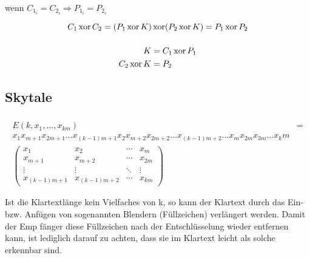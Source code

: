 \subsubsection{}

wenn $C_{1_i} = C_{2_i} \Rightarrow P_{1_i} = P_{2_i}$ 

\begin{equation}
C_1 \operatorname*{xor} C_2 = (P_1 \operatorname*{xor} K) \operatorname*{xor} (P_2 \operatorname*{xor} K) = P_1 \operatorname*{xor} P_2 
\end{equation}

\subsubsection{}

\begin{align}
K &= C_1 \operatorname*{xor} P_1 \\
C_2 \operatorname*{xor} K &= P_2
\end{align}


\subsection{Skytale}
\subsubsection{}

\begin{align}
E(k, x_1 , \ldots , x_{km} ) &= \\
x_1 x_{m+1} x_{2m+1} \ldots x_{(k−1)m+1} x_{2} x_{m+2} x_{2m+2} \ldots x_{(k−1)m+2} \ldots x_m x_{2m} x_{3m} \ldots x_km
\\
\begin{pmatrix}
x_1 & x_2 & \cdots & x_m \\ 
x_{m+1} & x_{m+2} & \cdots & x_{2m} \\ 
\vdots & \vdots & \ddots & \vdots \\ 
x_{(k-1)m+1} & x_{(k-1)m+2} & \cdots & x_{km}
\end{pmatrix} 
\end{align}



Ist die Klartextlänge kein Vielfaches von k, so kann der Klartext durch das Ein- bzw.
Anfügen von sogenannten Blendern (Füllzeichen) verlängert werden. Damit der Emp\-
fänger diese Füllzeichen nach der Entschlüsselung wieder entfernen kann, ist lediglich
darauf zu achten, dass sie im Klartext leicht als solche erkennbar sind.
